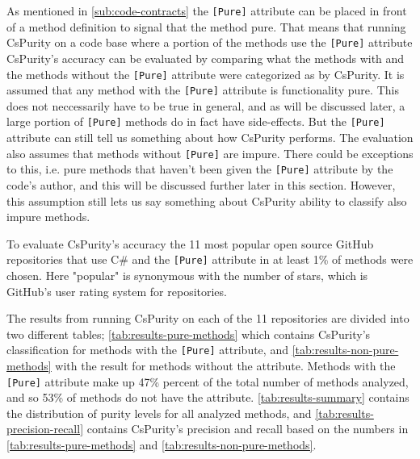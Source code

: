 \documentclass[a4paper,12pt]{article}
\begin{document}
As mentioned in \autoref{sub:code-contracts} the \texttt{[Pure]} attribute can be placed in front of a method definition to signal that the method pure. That means that running CsPurity on a code base where a portion of the methods use the \texttt{[Pure]} attribute CsPurity's accuracy can be evaluated by comparing what the methods with and the methods without the \texttt{[Pure]} attribute were categorized as by CsPurity. It is assumed that any method with the \texttt{[Pure]} attribute is functionality pure. This does not neccessarily have to be true in general, and as will be discussed later, a large portion of \texttt{[Pure]} methods do in fact have side-effects. But the \texttt{[Pure]} attribute can still tell us something about how CsPurity performs. The evaluation also assumes that methods without \texttt{[Pure]} are impure. There could be exceptions to this, i.e. pure methods that haven't been given the \texttt{[Pure]} attribute by the code's author, and this will be discussed further later in this section. %
However, this assumption still lets us say something about CsPurity ability to classify also impure methods.

To evaluate CsPurity's accuracy the 11 most popular open source GitHub repositories that use C\# and the \texttt{[Pure]} attribute in at least 1\% of methods were chosen. Here "popular" is synonymous with the number of stars, which is GitHub's user rating system for repositories.

The results from running CsPurity on each of the 11 repositories are divided into two different tables; \autoref{tab:results-pure-methods} which contains CsPurity's classification for methods with the \texttt{[Pure]} attribute, and \autoref{tab:results-non-pure-methods} with the result for methods without the attribute. Methods with the \texttt{[Pure]} attribute make up 47\% percent of the total number of methods analyzed, and so 53\% of methods do not have the attribute. \autoref{tab:results-summary} contains the distribution of purity levels for all analyzed methods, and \autoref{tab:results-precision-recall} contains CsPurity's precision and recall based on the numbers in \autoref{tab:results-pure-methods} and \autoref{tab:results-non-pure-methods}.
\end{document}
